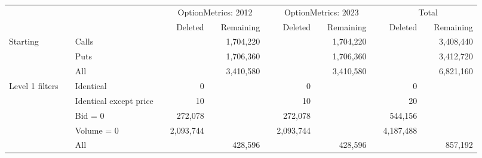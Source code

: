

    \begin{tabular}{*{4}{l} *{11}{r} }
       
        
         \multicolumn{4}{c}{}  & \multicolumn{3}{c}{OptionMetrics: 2012}  &  \multicolumn{1}{c}{} & 
         \multicolumn{3}{c}{OptionMetrics: 2023}&  \multicolumn{1}{c}{}  &
          \multicolumn{3}{c}{Total}  \\
         \cline{5-7}
                  
         \cline{9-11}
         \cline{13-15}
         
          &  & & & 
          Deleted &  & Remaining & &
          Deleted &  & Remaining & &
          Deleted &  & Remaining 
          \\

       \hline

	
				Starting & & Calls & &
				 & & 1,704,220 & &
				 & & 1,704,220 & &
				 & & 3,408,440 \\
			
				  & & Puts & &
				 & & 1,706,360 & &
				 & & 1,706,360 & &
				 & & 3,412,720 \\
			
				  & & All & &
				 & & 3,410,580 & &
				 & & 3,410,580 & &
				 & & 6,821,160 \\
			
				Level 1 filters & & Identical & &
				0 & &  & &
				0 & &  & &
				0 & &  \\
			
				  & & Identical except price & &
				10 & &  & &
				10 & &  & &
				20 & &  \\
			
				  & & Bid = 0 & &
				272,078 & &  & &
				272,078 & &  & &
				544,156 & &  \\
			
				  & & Volume = 0 & &
				2,093,744 & &  & &
				2,093,744 & &  & &
				4,187,488 & &  \\
			
				  & & All & &
				 & & 428,596 & &
				 & & 428,596 & &
				 & & 857,192 \\
			

	        \hline
	    \end{tabular}
	